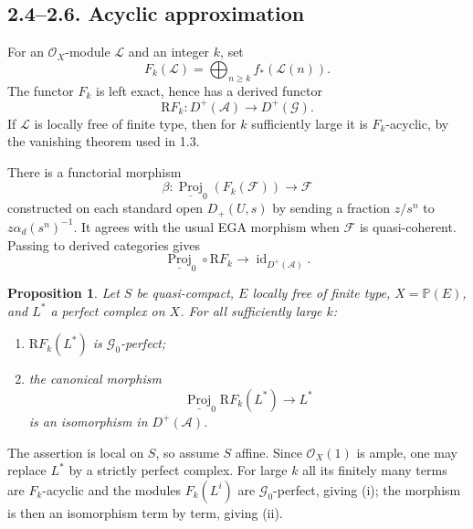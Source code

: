 \documentclass[13pt]{extarticle}
\newcommand{\cO}{\mathcal O}
\newcommand{\Proj}{\operatorname{Proj}}
\newcommand{\id}{\operatorname{id}}
\newcommand{\RR}{\mathrm R}
\newtheorem*{proposition}{Proposition}
\begin{document}
\subsection*{2.4--2.6. Acyclic approximation}
For an $\cO_X$-module $\mathcal L$ and an integer $k$, set
\begin{equation}\label{eq:VI.2.4.1}
F_k(\mathcal L)=\bigoplus_{n\geq k}f_*(\mathcal L(n)).
\end{equation}
The functor $F_k$ is left exact, hence has a derived functor
\begin{equation}\label{eq:VI.2.4.2}
\RR F_k:D^+(\mathcal A)\longrightarrow D^+(\mathcal G).
\end{equation}
If $\mathcal L$ is locally free of finite type, then for $k$ sufficiently large it is $F_k$-acyclic, by the vanishing theorem used in 1.3.

There is a functorial morphism
\begin{equation}\label{eq:VI.2.5.1}
\beta:\underline{\Proj}_0(F_k(\mathcal F))\longrightarrow\mathcal F
\end{equation}
constructed on each standard open $D_+(U,s)$ by sending a fraction $z/s^n$ to $z\alpha_d(s^n)^{-1}$. It agrees with the usual EGA morphism when $\mathcal F$ is quasi-coherent. Passing to derived categories gives
\begin{equation}\label{eq:VI.2.5.3}
\underline{\Proj}_0\circ\RR F_k\longrightarrow \id_{D^+(\mathcal A)}.
\end{equation}

\begin{proposition}\label{prop:VI.2.6}
Let $S$ be quasi-compact, $E$ locally free of finite type, $X=\mathbb P(E)$, and $L^*$ a perfect complex on $X$. For all sufficiently large $k$:
\begin{enumerate}[label=(\roman*)]
\item $\RR F_k(L^*)$ is $\mathcal G_0$-perfect;
\item the canonical morphism
\[
\underline{\Proj}_0\RR F_k(L^*)\longrightarrow L^*
\]
is an isomorphism in $D^+(\mathcal A)$.
\end{enumerate}
\end{proposition}

The assertion is local on $S$, so assume $S$ affine. Since $\cO_X(1)$ is ample, one may replace $L^*$ by a strictly perfect complex. For large $k$ all its finitely many terms are $F_k$-acyclic and the modules $F_k(L^i)$ are $\mathcal G_0$-perfect, giving (i); the morphism is then an isomorphism term by term, giving (ii).
\end{document}
